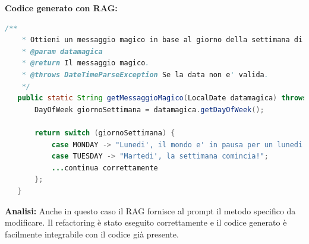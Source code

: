\documentclass[12pt,a4paper,openright,twoside]{book}
\begin{document}
\textbf{Codice generato con RAG:}
\begin{lstlisting}[language=Java]
    /**
    * Ottieni un messaggio magico in base al giorno della settimana di una data.
    * @param datamagica
    * @return Il messaggio magico.
    * @throws DateTimeParseException Se la data non e' valida.
    */
   public static String getMessaggioMagico(LocalDate datamagica) throws DateTimeParseException {
       DayOfWeek giornoSettimana = datamagica.getDayOfWeek();

       return switch (giornoSettimana) {
           case MONDAY -> "Lunedi', il mondo e' in pausa per un lunedi'";
           case TUESDAY -> "Martedi', la settimana comincia!";
           ...continua correttamente
       };
   }
\end{lstlisting}
\textbf{Analisi:}
Anche in questo caso il RAG fornisce al prompt il metodo specifico da modificare.
Il refactoring è stato eseguito correttamente e il codice generato è facilmente integrabile con il codice già presente.
\end{document}
